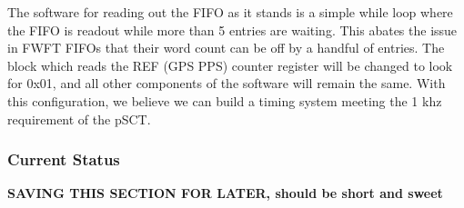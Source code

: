 The software for reading out the FIFO as it stands is a simple while loop where the FIFO is readout while more than 5 entries are waiting. This abates the issue in FWFT FIFOs that their word count can be off by a handful of entries. The block which reads the REF (GPS PPS) counter register will be changed to look for 0x01, and all other components of the software will remain the same. With this configuration, we believe we can build a timing system meeting the 1 khz requirement of the pSCT.

\subsubsection{Current Status}
\textbf{SAVING THIS SECTION FOR LATER, should be short and sweet}















